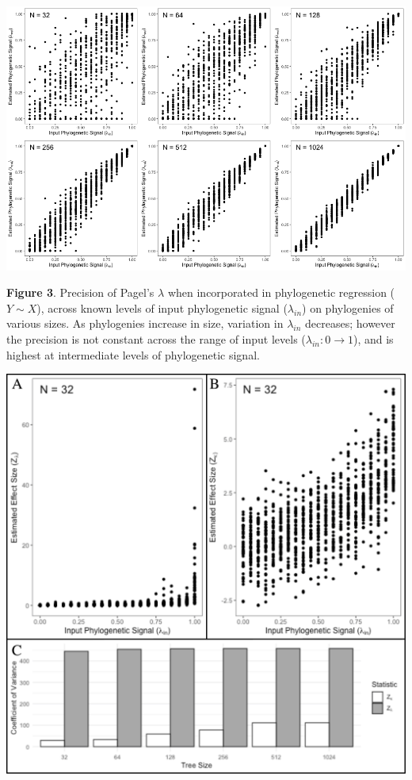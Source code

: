 \documentclass[]{article}
\begin{document}
\includegraphics[width=0.95\linewidth]{Fig3}

\singlespacing \textbf{Figure 3}. Precision of Pagel's \(\lambda\) when
incorporated in phylogenetic regression (\(Y\sim X\)), across known
levels of input phylogenetic signal (\(\lambda_{in}\)) on phylogenies of
various sizes. As phylogenies increase in size, variation in
\(\lambda_{in}\) decreases; however the precision is not constant across
the range of input levels (\(\lambda_{in}: 0 \to 1\)), and is highest at
intermediate levels of phylogenetic signal.

\newpage

\includegraphics[width=0.95\linewidth]{Fig4}
\end{document}
